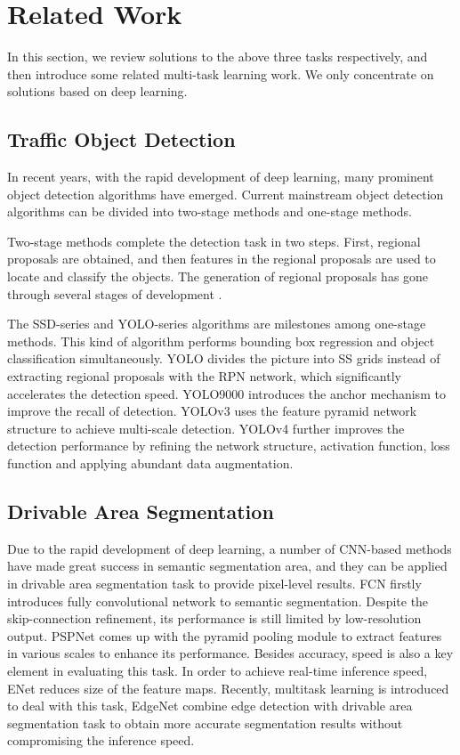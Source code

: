 \documentclass[10pt,twocolumn,letterpaper]{article}
\begin{document}
\section{Related Work}
In this section, we review solutions to the above three tasks respectively, and then introduce some related multi-task learning work. We only concentrate on solutions based on deep learning.

\subsection{Traffic Object Detection}
In recent years, with the rapid development of deep learning, many prominent object detection algorithms have emerged. Current mainstream object detection algorithms can be divided into two-stage methods and one-stage methods.

Two-stage methods complete the detection task in two steps. First, regional proposals are obtained, and then features in the regional proposals are used to locate and classify the objects. The generation of regional proposals has gone through several stages of development \cite{rcnn,fast-rcnn,faster-rcnn,r-fcn}. 

The SSD-series \cite{ssd} and YOLO-series algorithms are milestones among one-stage methods. This kind of algorithm performs bounding box regression and object classification simultaneously. YOLO \cite{yolo} divides the picture into SS grids instead of extracting regional proposals with the RPN network, which significantly accelerates the detection speed.
YOLO9000 \cite{yolov2} introduces the anchor mechanism to improve the recall of detection. YOLOv3 \cite{yolov3} uses the feature pyramid network structure to achieve multi-scale detection. YOLOv4 \cite{yolov4} further improves the detection performance by refining the network structure, activation function, loss function and applying abundant data augmentation.

\subsection{Drivable Area Segmentation}
Due to the rapid development of deep learning, a number of CNN-based methods have made great success in semantic segmentation area, and they can be applied in drivable area segmentation task to provide pixel-level results. FCN \cite{fcn} firstly introduces fully convolutional network to semantic segmentation. Despite the skip-connection refinement, its performance is still limited by low-resolution output. PSPNet \cite{pspnet} comes up with the pyramid pooling module to extract features in various scales to enhance its performance. Besides accuracy, speed is also a key element in evaluating this task. In order to achieve real-time inference speed, ENet \cite{enet} reduces size of the feature maps. Recently, multitask learning is introduced to deal with this task, EdgeNet \cite{edgenet} combine edge detection with drivable area segmentation task to obtain more accurate segmentation results without compromising the inference speed.
\end{document}
